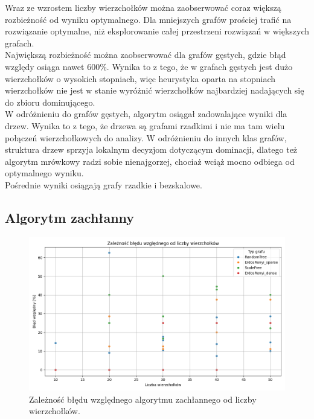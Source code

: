 Wraz ze wzrostem liczby wierzchołków można zaobserwować coraz większą rozbieżność od wyniku optymalnego. Dla mniejszych grafów prościej trafić na rozwiązanie optymalne, niż eksplorowanie całej przestrzeni rozwiązań w większych grafach.\\
Największą rozbieżność można zaobserwować dla grafów gęstych, gdzie błąd względy osiąga nawet 600\%. Wynika to z tego, że w grafach gęstych jest dużo wierzchołków o wysokich stopniach, więc heurystyka oparta na stopniach wierzchołków nie jest w stanie wyróżnić wierzchołków najbardziej nadających się do zbioru dominującego.\\
W odróżnieniu do grafów gęstych, algorytm osiągał zadowalające wyniki dla drzew. Wynika to z tego, że drzewa są grafami rzadkimi i nie ma tam wielu połączeń wierzchołkowych do analizy. W odróżnieniu do innych klas grafów, struktura drzew sprzyja lokalnym decyzjom dotyczącym dominacji, dlatego też algorytm mrówkowy radzi sobie nienajgorzej, chociaż wciąż mocno odbiega od optymalnego wyniku.\\
Pośrednie wyniki osiągają grafy rzadkie i bezskalowe.

\subsection{Algorytm zachłanny}

\begin{figure}[H]
    \centering
    \includegraphics[width=\textwidth]{assets/plots_approx/greedy.png}
    \caption{Zależność błędu względnego algorytmu zachłannego od liczby wierzchołków.}
    \label{fig:greedyPlot}
\end{figure}

